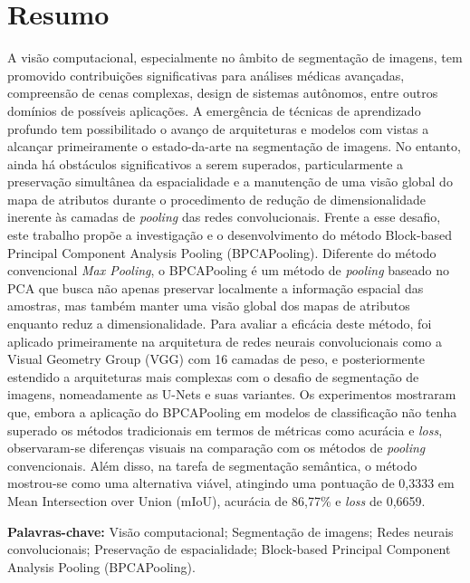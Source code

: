 \section*{Resumo}
\thispagestyle{empty}
\makeatletter
\makeatother
A visão computacional, especialmente no âmbito de segmentação de imagens, tem promovido contribuições significativas para análises médicas avançadas, compreensão de cenas complexas, design de sistemas autônomos, entre outros domínios de possíveis aplicações. A emergência de técnicas de aprendizado profundo tem possibilitado o avanço de arquiteturas e modelos com vistas a alcançar primeiramente o estado-da-arte na segmentação de imagens.
No entanto, ainda há obstáculos significativos a serem superados, particularmente a preservação simultânea da espacialidade e a manutenção de uma visão global do mapa de atributos durante o procedimento de redução de dimensionalidade inerente às camadas de \textit{pooling} das redes convolucionais.
Frente a esse desafio, este trabalho propõe a investigação e o desenvolvimento do método Block-based Principal Component Analysis Pooling (BPCAPooling). Diferente do método convencional \textit{Max Pooling}, o BPCAPooling é um método de \textit{pooling} baseado no PCA que busca não apenas preservar localmente a informação espacial das amostras, mas também manter uma visão global dos mapas de atributos enquanto reduz a dimensionalidade.
Para avaliar a eficácia deste método, foi aplicado primeiramente na arquitetura de redes neurais convolucionais como a Visual Geometry Group (VGG) com 16 camadas de peso, e posteriormente estendido a arquiteturas mais complexas com o desafio de segmentação de imagens, nomeadamente as U-Nets e suas variantes.
Os experimentos mostraram que, embora a aplicação do BPCAPooling em modelos de classificação não tenha superado os métodos tradicionais em termos de métricas como acurácia e \textit{loss}, observaram-se diferenças visuais na comparação com os métodos de \textit{pooling} convencionais. Além disso, na tarefa de segmentação semântica, o método mostrou-se como uma alternativa viável, atingindo uma pontuação de 0,3333 em Mean Intersection over Union (mIoU), acurácia de 86,77\% e \textit{loss} de 0,6659.

\textbf{Palavras-chave:} Visão computacional; Segmentação de imagens; Redes neurais convolucionais; Preservação de espacialidade; Block-based Principal Component Analysis Pooling (BPCAPooling).